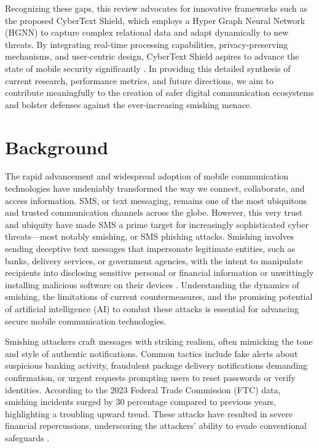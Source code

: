 \documentclass[conference]{IEEEtran}
\begin{document}
Recognizing these gaps, this review advocates for innovative frameworks such as the proposed CyberText Shield, which employs a Hyper Graph Neural Network (HGNN) to capture complex relational data and adapt dynamically to new threats. By integrating real-time processing capabilities, privacy-preserving mechanisms, and user-centric design, CyberText Shield aspires to advance the state of mobile security significantly \cite{ref9,ref12,ref14}. In providing this detailed synthesis of current research, performance metrics, and future directions, we aim to contribute meaningfully to the creation of safer digital communication ecosystems and bolster defenses against the ever-increasing smishing menace.


\section{Background}
\IEEEoverridecommandlockouts

The rapid advancement and widespread adoption of mobile communication technologies have undeniably transformed the way we connect, collaborate, and access information. SMS, or text messaging, remains one of the most ubiquitous and trusted communication channels across the globe. However, this very trust and ubiquity have made SMS a prime target for increasingly sophisticated cyber threats—most notably smishing, or SMS phishing attacks. Smishing involves sending deceptive text messages that impersonate legitimate entities, such as banks, delivery services, or government agencies, with the intent to manipulate recipients into disclosing sensitive personal or financial information or unwittingly installing malicious software on their devices \cite{ref1,ref7,ref11}. Understanding the dynamics of smishing, the limitations of current countermeasures, and the promising potential of artificial intelligence (AI) to combat these attacks is essential for advancing secure mobile communication technologies.

Smishing attackers craft messages with striking realism, often mimicking the tone and style of authentic notifications. Common tactics include fake alerts about suspicious banking activity, fraudulent package delivery notifications demanding confirmation, or urgent requests prompting users to reset passwords or verify identities. According to the 2023 Federal Trade Commission (FTC) data, smishing incidents surged by 30 percentage compared to previous years, highlighting a troubling upward trend. These attacks have resulted in severe financial repercussions, underscoring the attackers’ ability to evade conventional safeguards \cite{ref3,ref6}. 
\end{document}
